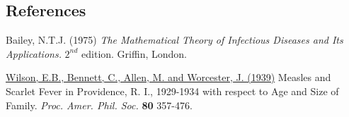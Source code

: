 \documentclass[
]{book}
\begin{document}
\hypertarget{references}{%
\subsection*{References}\label{references}}

Bailey, N.T.J. (1975) \emph{The Mathematical Theory of Infectious Diseases and Its Applications.} \(2^{nd}\) edition. Griffin, London.

\href{https://www.jstor.org/stable/984949\#metadata_info_tab_contents}{Wilson, E.B., Bennett, C., Allen, M. and Worcester, J. (1939)} Measles and Scarlet Fever in Providence, R. I., 1929-1934 with respect to Age and Size of Family. \emph{Proc. Amer. Phil. Soc.} \textbf{80} 357-476.

  
\end{document}

